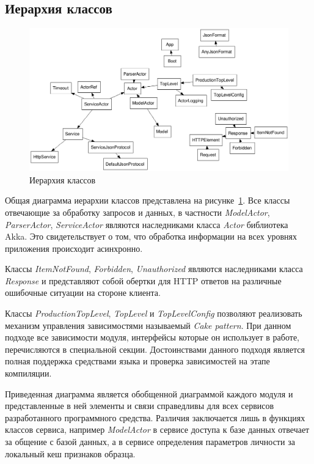 \subsection{Иерархия классов}
\begin{figure}[!ht]
    \centering
    \includegraphics[width=1\textwidth]{figures/classes-fdp.png}
    \caption{Иерархия классов}
    \label{fig:develoipment:class_fdp}
\end{figure}

Общая диаграмма иерархии классов представлена на рисунке~\ref{fig:develoipment:class_fdp}. Все классы отвечающие за обработку запросов и данных, в частности \emph{ModelActor}, \emph{ParserActor}, \emph{ServiceActor} являются наследниками класса \emph{Actor} библиотека Akka. Это свидетельствует о том, что обработка информации на всех уровнях приложения происходит асинхронно.

Классы \emph{ItemNotFound}, \emph{Forbidden}, \emph{Unauthorized} являются наследниками класса \emph{Response} и представляют собой обертки для HTTP ответов на различные ошибочные ситуации на стороне клиента.

Классы \emph{ProductionTopLevel}, \emph{TopLevel} и \emph{TopLevelConfig} позволяют реализовать механизм управления зависимостями называемый \emph{Cake pattern}. При данном подходе все зависимости модуля, интерфейсы которые он использует в работе, перечисляются в специальной секции. Достоинствами данного подходя является полная поддержка средствами языка и проверка зависимостей на этапе компиляции.

Приведенная диаграмма является обобщенной диаграммой каждого модуля и представленные в ней элементы и связи справедливы для всех сервисов разработанного программного средства. Различия заключается лишь в функциях классов сервиса, например \emph{ModelActor} в сервисе доступа к базе данных отвечает за общение с базой данных, а в сервисе определения параметров личности за локальный кеш признаков образца.

